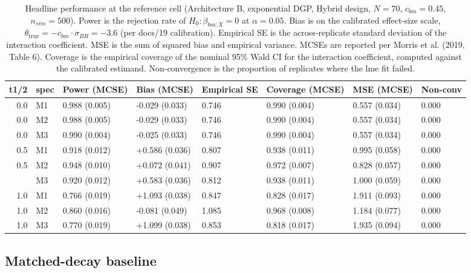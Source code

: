 \documentclass[
  11pt,
]{article}
\begin{document}
\begin{table}

\caption{\label{tab:headline}Headline performance at the reference cell
    (Architecture B, exponential DGP, Hybrid design, $N = 70$,
    $c_{bm} = 0.45$, $n_{sim} = 500$). Power is the rejection
    rate of $H_0: \beta_{bm:X} = 0$ at $\alpha = 0.05$.
    Bias is on the calibrated effect-size scale,
    $\theta_{\text{true}} = -c_{bm} \cdot \sigma_{BR} = -3.6$
    (per docs/19 calibration). Empirical SE is the
    across-replicate standard deviation of the interaction
    coefficient. MSE is the sum of squared bias and empirical
    variance. MCSEs are reported per Morris et al.
    (2019, Table 6). Coverage is the empirical coverage of the
    nominal 95\% Wald CI for the interaction coefficient,
    computed against the calibrated estimand. Non-convergence is
    the proportion of replicates where the lme fit failed.}
\centering
\begin{tabular}[t]{rlllllll}
\toprule
t1/2 & spec & Power (MCSE) & Bias (MCSE) & Empirical SE & Coverage (MCSE) & MSE (MCSE) & Non-conv\\
\midrule
0.0 & M1 & 0.988 (0.005) & -0.029 (0.033) & 0.746 & 0.990 (0.004) & 0.557 (0.034) & 0.000\\
0.0 & M2 & 0.988 (0.005) & -0.029 (0.033) & 0.746 & 0.990 (0.004) & 0.557 (0.034) & 0.000\\
0.0 & M3 & 0.990 (0.004) & -0.025 (0.033) & 0.746 & 0.990 (0.004) & 0.557 (0.034) & 0.000\\
0.5 & M1 & 0.918 (0.012) & +0.586 (0.036) & 0.807 & 0.938 (0.011) & 0.995 (0.058) & 0.000\\
0.5 & M2 & 0.948 (0.010) & +0.072 (0.041) & 0.907 & 0.972 (0.007) & 0.828 (0.057) & 0.000\\
\addlinespace
0.5 & M3 & 0.920 (0.012) & +0.583 (0.036) & 0.812 & 0.938 (0.011) & 1.000 (0.059) & 0.000\\
1.0 & M1 & 0.766 (0.019) & +1.093 (0.038) & 0.847 & 0.828 (0.017) & 1.911 (0.093) & 0.000\\
1.0 & M2 & 0.860 (0.016) & -0.081 (0.049) & 1.085 & 0.968 (0.008) & 1.184 (0.077) & 0.000\\
1.0 & M3 & 0.770 (0.019) & +1.099 (0.038) & 0.853 & 0.818 (0.017) & 1.935 (0.094) & 0.000\\
\bottomrule
\end{tabular}
\end{table}

\subsection{Matched-decay baseline}\label{matched-decay-baseline}
\end{document}
